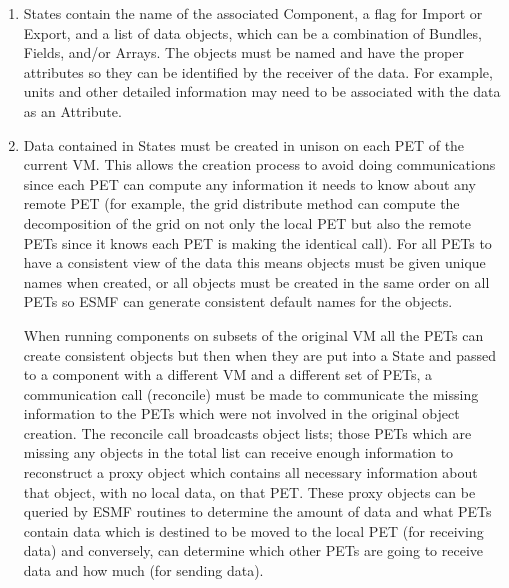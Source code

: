 %


\begin{enumerate}

\item
States contain the name of the associated Component, a flag for Import
or Export, and a list of data objects, which can be a combination of
Bundles, Fields, and/or Arrays.  The objects must be named and have
the proper attributes so they can be identified by the receiver of
the data.  For example, units and other detailed information
may need to be associated with the data as an Attribute.  

\item
Data contained in States must be created in unison on each
PET of the current VM.  This allows the creation process to avoid
doing communications since each PET can compute any information
it needs to know about any remote PET (for example, the grid
distribute method can compute the decomposition of the grid on
not only the local PET but also the remote PETs since it knows
each PET is making the identical call).  For all PETs to have a
consistent view of the data this means objects must be given
unique names when created, or all objects must be created in
the same order on all PETs so ESMF can generate consistent
default names for the objects.

When running components on subsets of the original VM all the
PETs can create consistent objects but then when they are put
into a State and passed to a component with a different VM and
a different set of PETs, a communication call (reconcile) must be 
made to communicate the missing information to the PETs which were 
not involved in the original object creation.  The reconcile call
broadcasts object lists; those PETs which are missing any objects
in the total list can receive enough information to
reconstruct a proxy object which contains all necessary information
about that object, with no local data, on that PET.  These proxy
objects can be queried by ESMF routines to determine the amount
of data and what PETs contain data which is destined to be moved
to the local PET (for receiving data) and conversely, can determine
which other PETs are going to receive data and how much (for
sending data).


\end{enumerate}

